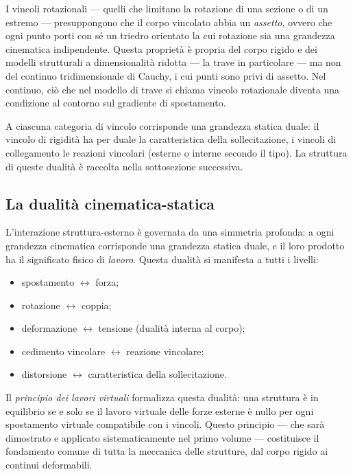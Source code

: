 \begin{oss}
	I vincoli rotazionali --- quelli che limitano la rotazione di una sezione o di un estremo --- presuppongono che il corpo vincolato abbia un \textit{assetto}, ovvero che ogni punto porti con sé un triedro orientato la cui rotazione sia una grandezza cinematica indipendente. Questa proprietà è propria del corpo rigido e dei modelli strutturali a dimensionalità ridotta --- la trave in particolare --- ma non del continuo tridimensionale di Cauchy, i cui punti sono privi di assetto. Nel continuo, ciò che nel modello di trave si chiama vincolo rotazionale diventa una condizione al contorno sul gradiente di spostamento.
\end{oss}

A ciascuna categoria di vincolo corrisponde una grandezza statica duale: il vincolo di rigidità ha per duale la caratteristica della sollecitazione, i vincoli di collegamento le reazioni vincolari (esterne o interne secondo il tipo). La struttura di queste dualità è raccolta nella sottosezione successiva.

\subsection{La dualità cinematica-statica}

L'interazione struttura-esterno è governata da una simmetria profonda: a ogni grandezza cinematica corrisponde una grandezza statica duale, e il loro prodotto ha il significato fisico di \textit{lavoro}. Questa dualità si manifesta a tutti i livelli:

\begin{itemize}[nosep]
	\item spostamento $\longleftrightarrow$ forza;
	\item rotazione $\longleftrightarrow$ coppia;
	\item deformazione $\longleftrightarrow$ tensione 	(dualità interna al corpo);
	\item cedimento vincolare $\longleftrightarrow$
	reazione vincolare;
	\item distorsione $\longleftrightarrow$	caratteristica della sollecitazione.
\end{itemize}

Il \textit{principio dei lavori virtuali} formalizza questa dualità: una struttura è in equilibrio se e solo se il lavoro virtuale delle forze esterne è nullo per ogni spostamento virtuale compatibile con i vincoli. Questo principio --- che sarà dimostrato e applicato sistematicamente nel primo volume --- costituisce il fondamento comune di tutta la meccanica delle strutture, dal corpo rigido ai continui deformabili.

